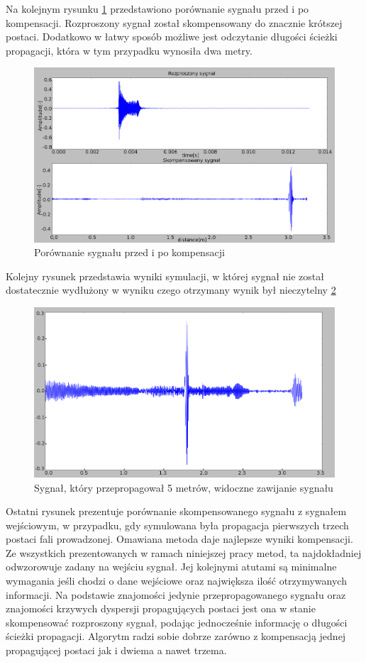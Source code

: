 Na kolejnym rysunku \ref{fig:wil1} przedstawiono porównanie sygnału przed i po kompensacji. Rozproszony sygnał został skompensowany do znacznie krótszej postaci. Dodatkowo w łatwy sposób możliwe jest odczytanie długości ścieżki propagacji, która w tym przypadku wynosiła dwa metry. 
\begin{figure}[h]
\centering
\includegraphics[width=14cm]{Zdjecia/4/wilcox1}
\caption{Porównanie sygnału przed i po kompensacji}
\label{fig:wil1}
\end{figure}
Kolejny rysunek przedstawia wyniki symulacji, w której sygnał nie został dostatecznie wydłużony w wyniku czego otrzymany wynik był nieczytelny \ref{fig:zawij}
\begin{figure}[h]
\centering
\includegraphics[width=14cm]{Zdjecia/4/naklada}
\caption{Sygnał, który przepropagował 5 metrów, widoczne zawijanie sygnału}
\label{fig:zawij}
\end{figure}
Ostatni rysunek prezentuje porównanie skompensowanego sygnału z sygnałem wejściowym, w przypadku, gdy symulowana była propagacja pierwszych trzech postaci fali prowadzonej. Omawiana metoda daje najlepsze wyniki kompensacji. Ze wszystkich prezentowanych w ramach niniejszej pracy metod, ta najdokładniej odwzorowuje zadany na wejściu sygnał. Jej kolejnymi atutami są minimalne wymagania jeśli chodzi o dane wejściowe oraz największa ilość otrzymywanych informacji. Na podstawie znajomości jedynie przepropagowanego sygnału oraz znajomości krzywych dyspersji propagujących postaci jest ona w stanie skompensować rozproszony sygnał, podając jednocześnie informację o długości ścieżki propagacji. Algorytm radzi sobie dobrze zarówno z kompensacją jednej propagującej postaci jak i dwiema a nawet trzema.


